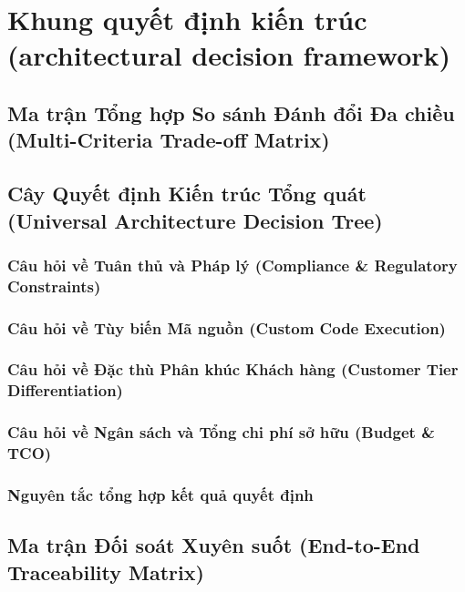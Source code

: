 \par{}
\section{Khung quyết định kiến trúc (architectural decision framework)}
\label{outline:2:decision-framework:1}

\par{}
\subsection{Ma trận Tổng hợp So sánh Đánh đổi Đa chiều (Multi-Criteria Trade-off Matrix)}
\label{outline:2:decision-framework:2}

\par{}
\subsection{Cây Quyết định Kiến trúc Tổng quát (Universal Architecture Decision Tree)}
\label{outline:2:decision-framework:3}

\par{}
\subsubsection{Câu hỏi về Tuân thủ và Pháp lý (Compliance \& Regulatory Constraints)}
\label{outline:2:decision-framework:4}

\par{}
\subsubsection{Câu hỏi về Tùy biến Mã nguồn (Custom Code Execution)}
\label{outline:2:decision-framework:5}

\par{}
\subsubsection{Câu hỏi về Đặc thù Phân khúc Khách hàng (Customer Tier Differentiation)}
\label{outline:2:decision-framework:6}

\par{}
\subsubsection{Câu hỏi về Ngân sách và Tổng chi phí sở hữu (Budget \& TCO)}
\label{outline:2:decision-framework:7}

\par{}
\subsubsection{Nguyên tắc tổng hợp kết quả quyết định}
\label{outline:2:decision-framework:8}

\par{}
\subsection{Ma trận Đối soát Xuyên suốt (End-to-End Traceability Matrix)}
\label{outline:2:decision-framework:9}
